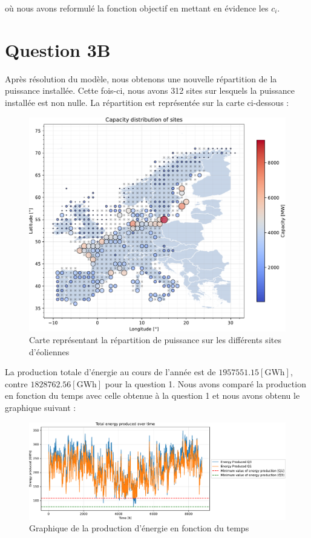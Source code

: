 \documentclass{article}
\newlength{\temp}
\begin{document}
où nous avons reformulé la fonction objectif en mettant en évidence les $c_i$.
\newpage
\section*{Question 3B}
Après résolution du modèle, nous obtenons une nouvelle répartition de la puissance installée. Cette fois-ci, nous avons 312 sites sur lesquels la puissance installée est non nulle. La répartition est représentée sur la carte ci-dessous :

\begin{figure}[h!]
    \centering
    \includegraphics[scale=0.4]{Images/Partie_1/Q3/capacity_distribution.pdf}
    \caption{Carte représentant la répartition de puissance sur les différents sites d'éoliennes}
    \label{fig:capacity_distribution_partie1_Q3}
\end{figure}

La production totale d'énergie au cours de l'année est de $1957551.15 [\mathrm{GWh}]$, contre $1828762.56 [\mathrm{GWh}]$ pour la question 1. Nous avons comparé la production en fonction du temps avec celle obtenue à la question 1 et nous avons obtenu le graphique suivant :

\begin{figure}[h!]
    \centering
    \includegraphics[scale=0.5]{Images/Partie_1/Q3/energy_produced_comparison.pdf}
    \caption{Graphique de la production d'énergie en fonction du temps}
    \label{fig:energy_produced_partie1_Q3}
\end{figure}
\end{document}
